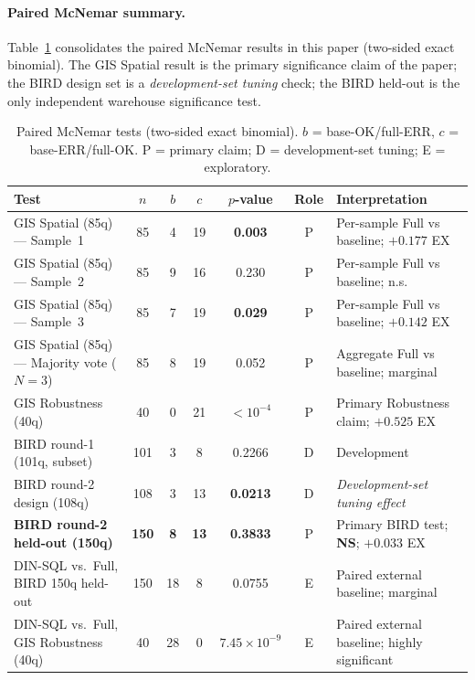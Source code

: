 \documentclass[11pt]{article}
\begin{document}
\paragraph{Paired McNemar summary.}
Table~\ref{tab:mcnemar} consolidates the paired McNemar results in this paper (two-sided exact binomial). The GIS Spatial result is the primary significance claim of the paper; the BIRD design set is a \emph{development-set tuning} check; the BIRD held-out is the only independent warehouse significance test.

\begin{table}[t]
\centering
\footnotesize
\caption{Paired McNemar tests (two-sided exact binomial). $b$ = base-OK/full-ERR, $c$ = base-ERR/full-OK. P = primary claim; D = development-set tuning; E = exploratory.}
\label{tab:mcnemar}
\begin{tabular}{lcccccp{3.5cm}}
\toprule
Test & $n$ & $b$ & $c$ & $p$-value & Role & Interpretation \\
\midrule
GIS Spatial (85q) --- Sample~1     & 85  & 4  & 19 & \textbf{0.003} & P & Per-sample Full vs baseline; $+0.177$ EX \\
GIS Spatial (85q) --- Sample~2     & 85  & 9  & 16 & 0.230 & P & Per-sample Full vs baseline; n.s. \\
GIS Spatial (85q) --- Sample~3     & 85  & 7  & 19 & \textbf{0.029} & P & Per-sample Full vs baseline; $+0.142$ EX \\
GIS Spatial (85q) --- Majority vote ($N{=}3$) & 85 & 8 & 19 & 0.052 & P & Aggregate Full vs baseline; marginal \\
GIS Robustness (40q)               & 40  & 0  & 21 & \textbf{$<10^{-4}$} & P & Primary Robustness claim; $+0.525$ EX \\
BIRD round-1 (101q, subset)        & 101 & 3  & 8  & 0.2266 & D & Development \\
BIRD round-2 design (108q)         & 108 & 3  & 13 & \textbf{0.0213} & D & \emph{Development-set tuning effect} \\
\textbf{BIRD round-2 held-out (150q)} & \textbf{150} & \textbf{8} & \textbf{13} & \textbf{0.3833} & P & Primary BIRD test; \textbf{NS}; $+0.033$ EX \\
DIN-SQL vs.\ Full, BIRD 150q held-out & 150 & 18 & 8 & 0.0755 & E & Paired external baseline; marginal \\
DIN-SQL vs.\ Full, GIS Robustness (40q) & 40  & 28 & 0  & \textbf{$7.45\times10^{-9}$} & E & Paired external baseline; highly significant \\
\bottomrule
\end{tabular}
\end{table}
\end{document}

